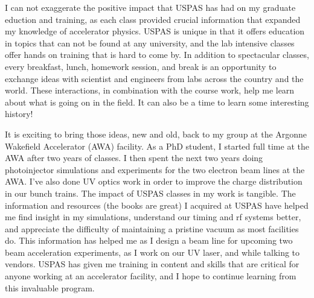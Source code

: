 \documentclass[11pt,a4paper,sans]{moderncv}        %
\begin{document}
I can not exaggerate the positive impact that USPAS has had on my graduate eduction and training, 
as each class provided crucial information that expanded my knowledge of accelerator physics. 
USPAS is unique in that it offers education in 
topics that can not be found at any university, and the lab intensive classes offer hands on training 
that is hard to come by. In addition to spectacular classes, every breakfast, lunch, homework session, 
and break is an opportunity to exchange ideas with scientist and engineers from labs across the country and the world.
These interactions, in combination with the course work, help me learn about what is going on in the field.
It can also be a time to learn some interesting history!

It is exciting to bring those ideas, new and old, back to my group at the 
Argonne Wakefield Accelerator (AWA) facility. As a PhD student, I started full time at the AWA 
after two years of classes. I then spent the next two years doing photoinjector 
simulations and experiments for the two electron beam lines at the AWA. 
I've also done UV optics work in order to improve the charge distribution in our bunch trains. 
The impact of USPAS classes in my work is tangible. The information and resources (the books are great) 
I acquired at USPAS have helped me find insight in my simulations, understand our timing and rf systems better, 
and appreciate the difficulty of maintaining a pristine vacuum as most facilities do. This information has helped me 
as I design a beam line for upcoming two beam acceleration experiments, as I work on our UV laser, and while
talking to vendors. USPAS has given me training in content and skills that are critical for anyone working
at an accelerator facility, and I hope to continue learning from this invaluable program.

\makeletterclosing

\end{document}
